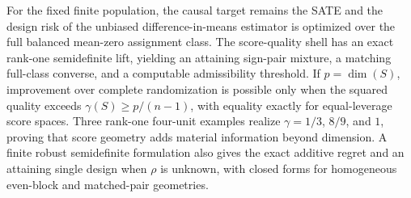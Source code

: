 For the fixed finite population, the causal target remains the SATE and the design risk of the unbiased difference-in-means estimator is optimized over the full balanced mean-zero assignment class. The score-quality shell has an exact rank-one semidefinite lift, yielding an attaining sign-pair mixture, a matching full-class converse, and a computable admissibility threshold. If \(p=\dim(S)\), improvement over complete randomization is possible only when the squared quality exceeds \(\gamma(S)\geq p/(n-1)\), with equality exactly for equal-leverage score spaces. Three rank-one four-unit examples realize \(\gamma=1/3\), \(8/9\), and \(1\), proving that score geometry adds material information beyond dimension. A finite robust semidefinite formulation also gives the exact additive regret and an attaining single design when \(\rho\) is unknown, with closed forms for homogeneous even-block and matched-pair geometries.